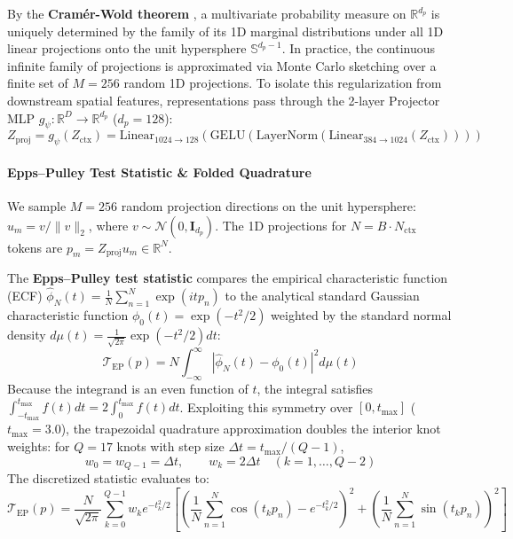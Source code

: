 \documentclass{article}
\begin{document}
By the \textbf{Cram\'er-Wold theorem} \citep{cramer1936theorems}, a multivariate probability measure on $\mathbb{R}^{d_p}$ is uniquely determined by the family of its 1D marginal distributions under all 1D linear projections onto the unit hypersphere $\mathbb{S}^{d_p - 1}$. In practice, the continuous infinite family of projections is approximated via Monte Carlo sketching over a finite set of $M = 256$ random 1D projections. To isolate this regularization from downstream spatial features, representations pass through the 2-layer Projector MLP $g_\psi: \mathbb{R}^D \to \mathbb{R}^{d_p}$ ($d_p = 128$):
\begin{equation}
    Z_{\text{proj}} = g_\psi(Z_{\text{ctx}}) = \text{Linear}_{1024 \to 128}\left(\text{GELU}\left(\text{LayerNorm}\left(\text{Linear}_{384 \to 1024}(Z_{\text{ctx}})\right)\right)\right)
\end{equation}

\paragraph{Epps--Pulley Test Statistic \& Folded Quadrature}
We sample $M = 256$ random projection directions on the unit hypersphere: $u_m = v / \|v\|_2$, where $v \sim \mathcal{N}(0, \mathbf{I}_{d_p})$. The 1D projections for $N = B \cdot N_{\text{ctx}}$ tokens are $p_m = Z_{\text{proj}} u_m \in \mathbb{R}^N$.

The \textbf{Epps--Pulley test statistic} \citep{epps1983test} compares the empirical characteristic function (ECF) $\hat{\phi}_N(t) = \frac{1}{N} \sum_{n=1}^N \exp(i t p_n)$ to the analytical standard Gaussian characteristic function $\phi_0(t) = \exp(-t^2 / 2)$ weighted by the standard normal density $d\mu(t) = \frac{1}{\sqrt{2\pi}} \exp(-t^2/2) dt$:
\begin{equation}
    \mathcal{T}_{\text{EP}}(p) = N \int_{-\infty}^{\infty} |\hat{\phi}_N(t) - \phi_0(t)|^2 d\mu(t)
\end{equation}
Because the integrand is an even function of $t$, the integral satisfies $\int_{-t_{\text{max}}}^{t_{\text{max}}} f(t) dt = 2 \int_0^{t_{\text{max}}} f(t) dt$. Exploiting this symmetry over $[0, t_{\text{max}}]$ ($t_{\text{max}} = 3.0$), the trapezoidal quadrature approximation doubles the interior knot weights: for $Q = 17$ knots with step size $\Delta t = t_{\text{max}} / (Q - 1)$,
\begin{equation}
    w_0 = w_{Q-1} = \Delta t, \qquad w_k = 2 \Delta t \quad (k = 1, \dots, Q-2)
\end{equation}
The discretized statistic evaluates to:
\begin{equation}
    \mathcal{T}_{\text{EP}}(p) = \frac{N}{\sqrt{2\pi}} \sum_{k=0}^{Q-1} w_k e^{-t_k^2/2} \left[ \left( \frac{1}{N} \sum_{n=1}^N \cos(t_k p_n) - e^{-t_k^2/2} \right)^2 + \left( \frac{1}{N} \sum_{n=1}^N \sin(t_k p_n) \right)^2 \right]
\end{equation}
\end{document}
